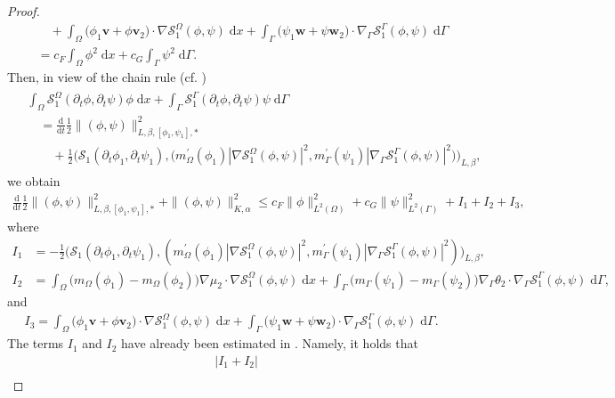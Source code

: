 \documentclass[10pt,reqno]{amsart}
\theoremstyle{remark}
\numberwithin{equation}{section}
\newcommand{\abs}[1]{| #1 |}
\newcommand{\norm}[1]{\| #1 \|}
\newcommand{\intO}{\int_\Omega}
\newcommand{\intG}{\int_\Gamma}
\newcommand{\dx}{\;\mathrm{d}x}
\newcommand{\dG}{\;\mathrm d\Ga}
\newcommand{\ddt}{\frac{\mathrm d}{\mathrm dt}}
\newcommand{\delt}{\partial_{t}}
\newcommand{\Grad}{\nabla}
\newcommand{\Gradg}{\nabla_\Ga}
\newcommand{\Om}{\Omega}
\newcommand{\Ga}{\Gamma}
\begin{document}
\begin{proof}
\begin{align*}
        &\qquad + \intO \big(\phi_1\mathbf{v} + \phi\mathbf{v}_2\big)\cdot\Grad\mathcal{S}_1^\Om(\phi,\psi)\dx + \intG \big(\psi_1\mathbf{w} + \psi\mathbf{w}_2\big)\cdot\Gradg\mathcal{S}_1^\Ga(\phi,\psi)\dG \\
    	&\quad = c_F\intO \phi^2 \dx + c_G\intG \psi^2\dG.
    \end{align*}
    Then, in view of the chain rule (cf. \cite[Eqn.~(5.18)]{Stange2025})
    \begin{align}\label{ChainRuleFormula}
	   \begin{split}
	   &\intO \mathcal{S}_1^\Om(\delt\phi,\delt\psi)\phi\dx + \intG \mathcal{S}_1^\Ga(\delt\phi,\delt\psi)\psi\dG  \\
	   &\quad = \ddt\frac12 \norm{(\phi,\psi)}_{L,\beta,[\phi_1,\psi_1],\ast}^2 \\
	   &\qquad + \frac12 \Big(\mathcal{S}_1(\delt\phi_1,\delt\psi_1),\big(m_\Om^\prime(\phi_1)\abs{\Grad\mathcal{S}_1^\Om(\phi,\psi)}^2,m_\Ga^\prime(\psi_1)\abs{\Gradg\mathcal{S}_1^\Ga(\phi,\psi)}^2\big)\Big)_{L,\beta},
	   \end{split}
    \end{align}
    we obtain
    \begin{align}\label{DiffIneq}
    		\ddt\frac12\norm{(\phi,\psi)}_{L,\beta,[\phi_1,\psi_1],\ast}^2 + \norm{(\phi,\psi)}_{K,\alpha}^2 \leq c_F\norm{\phi}_{L^2(\Om)}^2 + c_G\norm{\psi}_{L^2(\Ga)}^2 + I_1 + I_2 + I_3,
    \end{align}
    where
    \begin{align*}
    	I_1 &=  -\frac12 \big(\mathcal{S}_1(\delt\phi_1,\delt\psi_1),(m_\Om^\prime(\phi_1)\abs{\Grad\mathcal{S}_1^\Om(\phi,\psi)}^2,m_\Ga^\prime(\psi_1)\abs{\Gradg\mathcal{S}_1^\Ga(\phi,\psi)}^2)\big)_{L,\beta}, \\
        I_2 &=  \intO \big(m_\Om(\phi_1) - m_\Om(\phi_2)\big)\Grad\mu_2\cdot\Grad\mathcal{S}^\Om_1(\phi,\psi)\dx + \intG \big(m_\Ga(\psi_1) - m_\Ga(\psi_2)\big)\Gradg\theta_2\cdot\Gradg\mathcal{S}^\Ga_1(\phi,\psi)\dG,
    \end{align*}
    and
    \begin{align*}
    	I_3 = \intO \big(\phi_1\mathbf{v} + \phi\mathbf{v}_2\big)\cdot\Grad\mathcal{S}_1^\Om(\phi,\psi)\dx + \intG \big(\psi_1\mathbf{w} + \psi\mathbf{w}_2\big)\cdot\Gradg\mathcal{S}_1^\Ga(\phi,\psi)\dG.
    \end{align*}
    The terms $I_1$ and $I_2$ have already been estimated in \cite{Stange2025}. Namely, it holds that
    \begin{align*}
        &\abs{I_1 + I_2} \\

\end{align*}
\end{proof}
\end{document}
